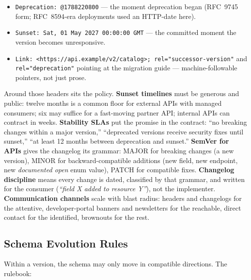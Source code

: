 \begin{itemize}
  \item \texttt{Deprecation: @1788220800} --- the moment deprecation began
        (RFC~9745 form; RFC~8594-era deployments used an HTTP-date here).
  \item \texttt{Sunset: Sat, 01 May 2027 00:00:00 GMT} --- the committed
        moment the version becomes unresponsive.
  \item \texttt{Link: <https://api.example/v2/catalog>;
        rel="successor-version"} and
        \texttt{rel="deprecation"} pointing at the migration guide ---
        machine-followable pointers, not just prose.
\end{itemize}

Around those headers sits the policy. \textbf{Sunset timelines} must be
generous and public: twelve months is a common floor for external APIs with
managed consumers; six may suffice for a fast-moving partner API; internal
APIs can contract in weeks. \textbf{Stability SLAs} put the promise in the
contract: ``no breaking changes within a major version,'' ``deprecated
versions receive security fixes until sunset,'' ``at least 12 months between
deprecation and sunset.'' \textbf{SemVer for APIs} gives the changelog its
grammar: MAJOR for breaking changes (a new version), MINOR for
backward-compatible additions (new field, new endpoint, new \emph{documented
open} enum value), PATCH for compatible fixes. \textbf{Changelog discipline}
means every change is dated, classified by that grammar, and written for the
consumer (\emph{``field X added to resource Y''}), not the implementer.
\textbf{Communication channels} scale with blast radius: headers and
changelogs for the attentive, developer-portal banners and newsletters for
the reachable, direct contact for the identified, brownouts for the rest.

\subsection{Schema Evolution Rules}
\label{subsec:ch9-schema}

Within a version, the schema may only move in compatible directions. The
rulebook:


